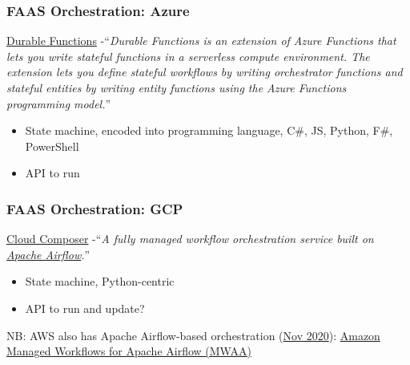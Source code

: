 \documentclass[11pt,aspectratio=169]{beamer}
\begin{document}
\begin{nrcanFrame}
  \frametitle{FAAS Orchestration: Azure}
    \href{https://docs.microsoft.com/en-us/azure/azure-functions/durable/}
         {Durable Functions}
         -``\textit{Durable Functions is an extension of Azure
           Functions that lets you write stateful functions in a
           serverless compute environment. The extension lets you
           define stateful workflows by writing orchestrator functions
           and stateful entities by writing entity functions using the
           Azure Functions programming model.}''
         \begin{itemize}
         \item State machine, encoded into programming language, C\#,
           JS, Python, F\#, PowerShell
         \item API \alert{to run}
         \end{itemize}
\end{nrcanFrame}

\begin{nrcanFrame}
  \frametitle{FAAS Orchestration: GCP}
  \href{https://cloud.google.com/composer/}
       {Cloud Composer}
       -``\textit{A fully managed workflow orchestration service
         built on
         \href{https://airflow.apache.org/}{Apache Airflow}.}''
       \begin{itemize}
       \item State machine, Python-centric
       \item API to run and update?
       \end{itemize}
       \vspace{3mm}
       NB: AWS also has Apache Airflow-based orchestration
       (\href{https://aws.amazon.com/about-aws/whats-new/2020/11/introducing-amazon-managed-workflows-for-apache-airflow-mwaa/}
       {Nov 2020}):
       \href{https://aws.amazon.com/managed-workflows-for-apache-airflow/}
            {Amazon Managed Workflows for Apache Airflow (MWAA)}
\end{nrcanFrame}


\nrcanLastFrame
\end{document}
